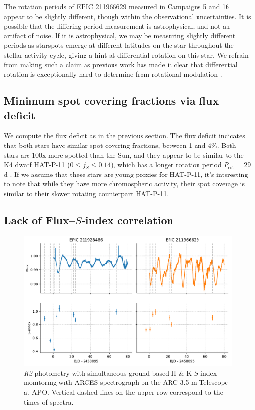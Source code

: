 The rotation periods of EPIC 211966629 measured in Campaigns 5 and 16 appear to be slightly different, though within the observational uncertainties. It is possible that the differing period measurement is astrophysical, and not an artifact of noise. If it is astrophysical, we may be measuring slightly different periods as starspots emerge at different latitudes on the star throughout the stellar activity cycle, giving a hint at differential rotation on this star. We refrain from making such a claim as previous work has made it clear that differential rotation is exceptionally hard to determine from rotational modulation \citep{Aigrain2015}.

\subsection{Minimum spot covering fractions via flux deficit}

We compute the flux deficit as in the previous section. The flux deficit indicates that both stars have similar spot covering fractions, between 1 and 4\%. Both stars are 100x more spotted than the Sun, and they appear to be similar to the K4 dwarf HAT-P-11 ($0 \leq f_S \leq 0.14$), which has a longer rotation period $P_\mathrm{rot} = 29$ d \citep{Morris2017a, Morris2018d}. If we assume that these stars are young proxies for HAT-P-11, it's interesting to note that while they have more chromospheric activity, their spot coverage is similar to their slower rotating counterpart HAT-P-11. 

\subsection{Lack of Flux--$S$-index correlation}

\begin{figure}
    \centering
    \includegraphics[scale=0.8]{nephelion/photometry_sindices.pdf}
    \caption{{\it K2} photometry with simultaneous ground-based  H \& K $S$-index monitoring with ARCES spectrograph on the ARC 3.5 m Telescope at APO. Vertical dashed lines on the upper row correspond to the times of spectra. }
    \label{fig:photometry_sindices}
\end{figure}

